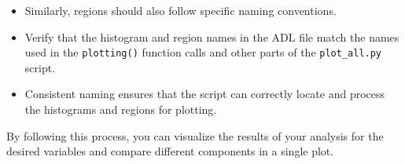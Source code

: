 \documentclass{article}
\begin{document}
\begin{itemize}
    \item Similarly, regions should also follow specific naming conventions.
\end{itemize}

\begin{itemize}
    \item Verify that the histogram and region names in the ADL file match the names used in the \texttt{plotting()} function calls and other parts of the \texttt{plot\_all.py} script.
    \item Consistent naming ensures that the script can correctly locate and process the histograms and regions for plotting.
\end{itemize}

By following this process, you can visualize the results of your analysis for the desired variables and compare different components in a single plot.
\end{document}
